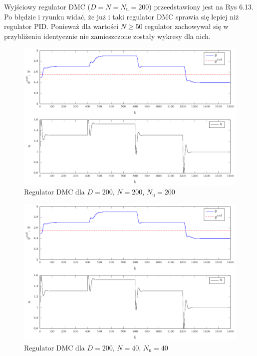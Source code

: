 Wyjściowy regulator DMC ($D=N=N_{\mathrm{u}}=200$) przeedstawiony jest na Rys 6.13. Po błędzie i ryunku widać, że już i taki regulator DMC sprawia się lepiej niż regulator PID. Ponieważ dla wartości $N\ge{50}$ regulator zachowywał się w przybliżeniu identycznie nie zamieszczone zostały wykresy dla nich.


\begin{figure}[tb] 
\centering 
\includegraphics[scale=1]{rysunki/zapisz_pdf/DMC_D=200.000_N=200.00_Nu=200.00.pdf} 
\caption{Regulator DMC dla $D=200$, $N=200$, $N_{\mathrm{u}}=200$} 
\label{r_pgfplots_DMC_D=200.000_N=200.00_Nu=200.00} 
\end{figure}

\begin{figure}[tb] 
\centering 
\includegraphics[scale=1]{rysunki/zapisz_pdf/DMC_D=200.000_N=40.00_Nu=40.00.pdf} 
\caption{Regulator DMC dla $D=200$, $N=40$, $N_{\mathrm{u}}=40$} 
\label{r_pgfplots_DMC_D=200.000_N=40.00_Nu=40.00} 
\end{figure}

